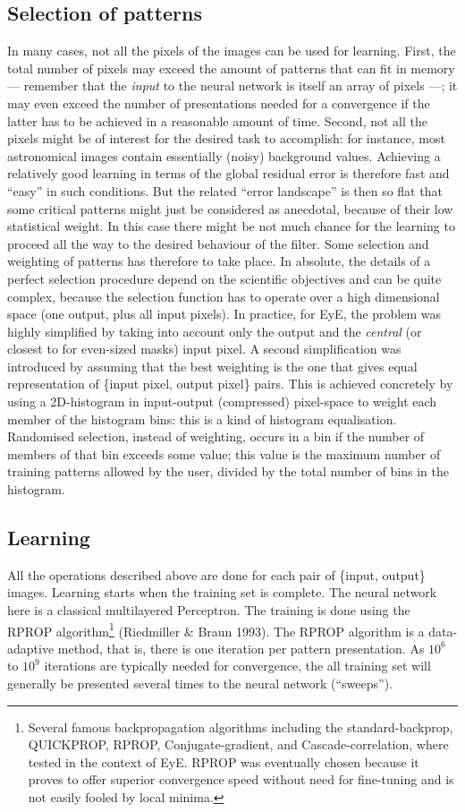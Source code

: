 \documentclass[11pt,titlepage]{article}
\begin{document}
\subsection{Selection of patterns}
In many cases, not all the pixels of the images can be used for learning. First, the total number of pixels may exceed the
amount of patterns that can fit in memory --- remember that the {\em input} to the neural network is itself an array of pixels
---; it may even exceed the number of presentations needed for a convergence if the latter has to be achieved in a reasonable
amount of time. Second, not all the pixels might be of interest for the desired task to accomplish: for instance, most
astronomical images contain essentially (noisy) background values. Achieving a relatively good learning
in terms of the global residual error is therefore fast and ``easy'' in such conditions. But the related ``error landscape'' is
then so flat that some critical patterns might just be considered as anecdotal, because of their low statistical weight. In
this case there might be not much chance for the learning to proceed all the way to the desired behaviour of the filter. Some
selection and weighting of patterns has therefore to take place. In absolute, the details of a perfect selection procedure depend
on the scientific objectives and can be quite complex, because the selection function has to operate over a high dimensional
space (one output, plus all input pixels). In practice, for {\sc EyE}, the problem was highly simplified by taking into
account only the output and the {\em central} (or closest to for even-sized masks) input pixel. A second simplification was
introduced by assuming that the best weighting is the one that gives equal representation of \{input pixel, output pixel\} pairs.
This is achieved concretely by using a 2D-histogram in input-output (compressed) pixel-space to weight each member of the
histogram bins: this is a kind of histogram equalisation. Randomised selection, instead of weighting, occurs in a bin if the
number of members of that bin exceeds some value; this value is the maximum number of training patterns allowed by the user,
divided by the total number of bins in the histogram.

\subsection{Learning}
All the operations described above are done for each pair of \{input, output\} images. Learning starts when the training set is
complete. The neural network here is a classical multilayered Perceptron. The
training is done using the RPROP
algorithm\footnote{Several famous backpropagation algorithms including the standard-backprop, QUICKPROP, RPROP, Conjugate-gradient,
and Cascade-correlation, where tested in the context of {\sc EyE}. RPROP was eventually chosen because it proves to offer superior
convergence speed without need for fine-tuning and is not easily fooled by local minima. }
(Riedmiller \& Braun 1993). The RPROP algorithm is a data-adaptive method, that is, there is one iteration per pattern
presentation. As $10^6$ to $10^9$ iterations are typically needed for convergence, the all training set will generally be presented
several times to the neural network (``sweeps''). 
\end{document}

